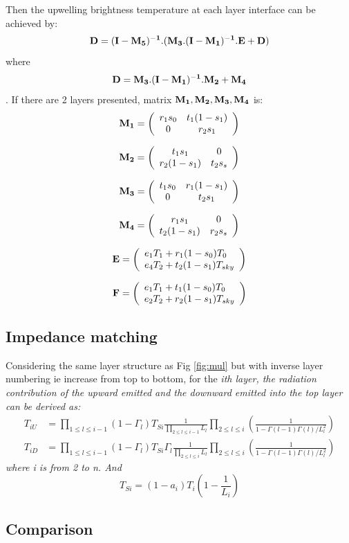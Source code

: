 Then the upwelling brightness temperature at each layer interface can be achieved by:
\begin{equation*}
    \bf{D} = (\bf{I} -\bf{M_5})^{-1}.(\bf{M_3}.(\bf{I}-\bf{M_1})^{-1}.\bf{E}+\bf{D}) 
 \end{equation*}
where 
\begin{equation*}
  \bf{D}=\bf{M_3}.{(\bf{I}-\bf{M_1})^{-1}.\bf{M_2}}+\bf{M_4}
\end{equation*}.
If there are 2 layers presented, matrix $\bf{M_1,M_2,M_3,M_4}$ is:
\[ \bf{M_1} = \left( \begin{array}{cc}
r_1s_0 & t_1(1-s_1) \\
0      & r_2s_1     \end{array} \right) \] 

\[ \bf{M_2} = \left( \begin{array}{cccc}
t_1s_1 & 0  \\
r_2(1-s_1) & t_2s_s \end{array} \right) \] 

\[ \bf{M_3} = \left( \begin{array}{cccc}
t_1s_0 & r_1(1-s_1) \\
0      & t_2s_1     \end{array} \right) \] 


\[ \bf{M_4} = \left( \begin{array}{cccc}
r_1s_1 & 0  \\
t_2(1-s_1)      & r_2s_s   \end{array} \right) \] 

\[ \bf{E} = \left( \begin{array}{l}
e_1T_1 + r_1(1-s_0)T_0\\
e_4T_2 + t_2(1-s_1)T_{sky} \end{array} \right) \] 

\[ \bf{F} = \left( \begin{array}{l}
e_1T_1 + t_1(1-s_0)T_0\\
e_2T_2 + r_2(1-s_1)T_{sky} \end{array} \right) \] 
\subsection{Impedance matching}
\label{sec:mul_impedance}
Considering the same layer structure as Fig \ref{fig:mul} but with inverse layer numbering ie increase from top to bottom, for the  \sl{i}th layer, the radiation contribution of the upward emitted and the downward emitted into the top layer can be derived as:
\begin{equation*}
\begin{split}
T_{iU} &= \prod_{1\le l\le i-1}(1-\Gamma_l)T_{Si}\frac{1}{\prod_{2\le l\le i-1}L_l}\prod_{2\le l\le i}(\frac{1}{1-\Gamma(l-1)\Gamma(l)/L_l^2})\\ 
T_{iD} &= \prod_{1\le l\le i-1}(1-\Gamma_l)T_{Si}\Gamma_l\frac{1}{\prod_{2\le l\le i}L_l}\prod_{2\le l\le i}(\frac{1}{1-\Gamma(l-1)\Gamma(l)/L_l^2})  
\end{split}
\end{equation*}
where i is from 2 to n. And 
\begin{equation*}
  T_{Si}= (1-a_i)T_i(1-\frac{1}{L_i})
\end{equation*}
\subsection{Comparison}               


